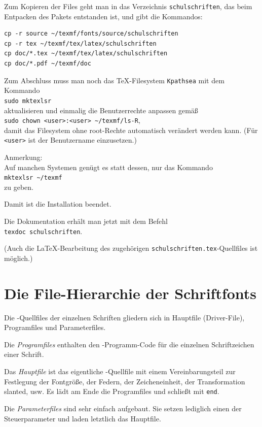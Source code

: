 \documentclass[12pt,titlepage]{article}
\begin{document}
Zum Kopieren der Files geht man 
in das Verzeichnis \verb+schulschriften+, 
das beim Entpacken des Pakets entstanden ist, und gibt die Kommandos:
\begin{verbatim}
cp -r source ~/texmf/fonts/source/schulschriften
cp -r tex ~/texmf/tex/latex/schulschriften
cp doc/*.tex ~/texmf/tex/latex/schulschriften
cp doc/*.pdf ~/texmf/doc
\end{verbatim}
Zum Abschluss muss man noch das \TeX-Filesystem \verb+Kpathsea+
mit dem   Kommando\\
\verb+sudo mktexlsr+\\
aktualisieren und einmalig die Benutzerrechte anpassen gem\"a\ss{}\\
\verb+sudo chown <user>:<user> ~/texmf/ls-R+,\\
damit das Filesystem ohne root-Rechte automatisch ver\"andert werden
kann.
(F\"ur \verb+<user>+ ist der Benutzername einzusetzen.) 

Anmerkung:\\
Auf manchen Systemen gen\"ugt es statt dessen, nur das Kommando\\
\verb+mktexlsr ~/texmf+\\
zu geben.

Damit ist die Installation beendet.

Die Dokumentation erh\"alt man jetzt mit dem Befehl\\
\verb+texdoc schulschriften+.

(Auch die \LaTeX-Bearbeitung des zugeh\"origen
\verb+schulschriften.tex+-Quellfiles 
ist m\"oglich.)

\section{Die File-Hierarchie der Schriftfonts}
Die \MF-Quellfiles der einzelnen Schriften gliedern sich in
Hauptfile (Driver-File), Programfiles und
Parameterfiles.

Die \emph{Programfiles} enthalten den \MF-Programm-Code
f\"ur die einzelnen Schriftzeichen einer Schrift.

Das \emph{Hauptfile} ist das eigentliche \MF-Quellfile mit
einem Vereinbarungsteil zur Festlegung der Fontgr\"o\ss{}e,
der Federn, der Zeicheneinheit, der Transformation slanted, usw.
Es l\"adt am Ende die Programfiles und schlie\ss{}t mit \verb+end+.

Die \emph{Parameterfiles} sind sehr einfach aufgebaut. Sie setzen
lediglich einen der Steuerparameter und laden letztlich das Hauptfile.
\end{document}
